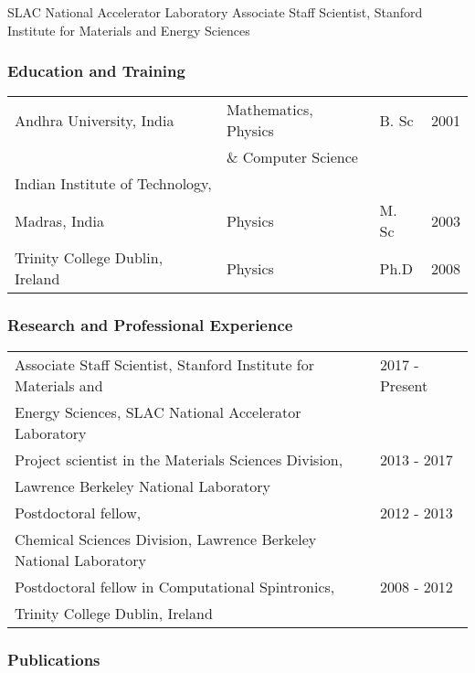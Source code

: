 SLAC National Accelerator Laboratory Associate Staff Scientist, Stanford Institute for Materials and Energy Sciences

\subsubsection*{Education and Training}

\begin{table}[ht]
    \centering
    \begin{tabular}{llll}
       Andhra University, India  & Mathematics, Physics & B. Sc & 2001 \\
       & \& Computer Science & & \\
        Indian Institute of Technology, & & &\\
        Madras, India & Physics & M. Sc & 2003 \\
        Trinity College Dublin, Ireland & Physics & Ph.D & 2008 \\
    \end{tabular}
\end{table}

\subsubsection*{Research and Professional Experience}

\begin{table}[ht]
    \centering
    \begin{tabular}{ll}
       Associate Staff Scientist, Stanford Institute for Materials and & 2017 - Present   \\
      Energy Sciences, SLAC National Accelerator Laboratory & \\
      Project scientist in the Materials Sciences Division, & 2013 - 2017 \\
      Lawrence Berkeley National Laboratory & \\
      Postdoctoral fellow, & 2012 - 2013 \\
      Chemical Sciences Division, Lawrence Berkeley National Laboratory & \\
        Postdoctoral fellow in Computational Spintronics, & 2008 - 2012 \\
        Trinity College Dublin, Ireland & \\
    \end{tabular}
\end{table}

\subsubsection*{Publications}

